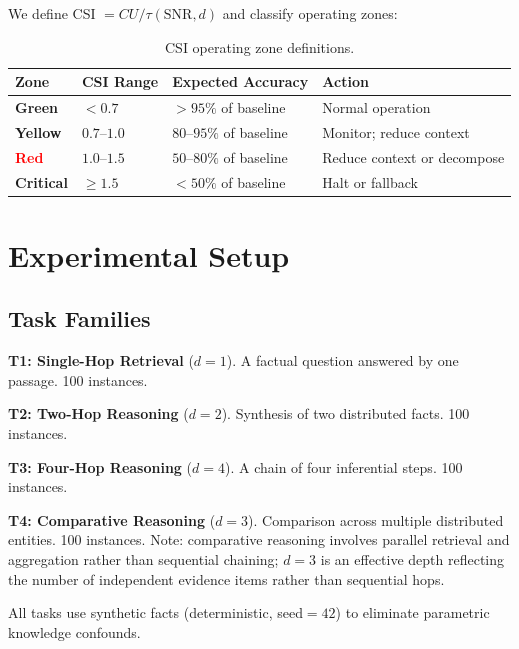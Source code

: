 \documentclass{article}
\begin{document}
We define CSI $= CU / \tau(\mathrm{SNR}, d)$ and classify operating zones:

\begin{table}[h]
\centering
\small
\caption{CSI operating zone definitions.}
\label{tab:csi_zones}
\begin{tabular}{@{}llll@{}}
\toprule
Zone & CSI Range & Expected Accuracy & Action \\
\midrule
\textcolor{green!60!black}{\textbf{Green}} & ${}<0.7$ & ${}>95\%$ of baseline & Normal operation \\
\textcolor{yellow!70!black}{\textbf{Yellow}} & $0.7$--$1.0$ & $80$--$95\%$ of baseline & Monitor; reduce context \\
\textcolor{red}{\textbf{Red}} & $1.0$--$1.5$ & $50$--$80\%$ of baseline & Reduce context or decompose \\
\textcolor{red!70!black}{\textbf{Critical}} & $\geq 1.5$ & ${}<50\%$ of baseline & Halt or fallback \\
\bottomrule
\end{tabular}
\end{table}

\section{Experimental Setup}
\label{sec:experimental}

\subsection{Task Families}

\textbf{T1: Single-Hop Retrieval} ($d{=}1$). A factual question answered by one passage. 100 instances.

\textbf{T2: Two-Hop Reasoning} ($d{=}2$). Synthesis of two distributed facts. 100 instances.

\textbf{T3: Four-Hop Reasoning} ($d{=}4$). A chain of four inferential steps. 100 instances.

\textbf{T4: Comparative Reasoning} ($d{=}3$). Comparison across multiple distributed entities. 100 instances. Note: comparative reasoning involves parallel retrieval and aggregation rather than sequential chaining; $d{=}3$ is an effective depth reflecting the number of independent evidence items rather than sequential hops.

All tasks use synthetic facts (deterministic, seed${}=42$) to eliminate parametric knowledge confounds.
\end{document}
